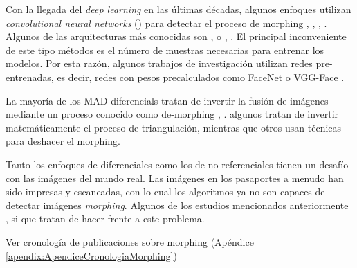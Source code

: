 Con la llegada del \textit{deep learning} en las últimas décadas, algunos enfoques utilizan \textit{convolutional neural networks} () para detectar el proceso de \gls{morphing} \cite{seibold2017detection}, \cite{seibold2018accurate}, \cite{wandzik2018morphing}, \cite{damer2018morgan}. Algunos de las arquitecturas más conocidas son  \cite{simonyan2014very},  \cite{krizhevsky2012imagenet} o  \cite{goodfellow2014generative}, \cite{debiasi2019detection}. El principal inconveniente de este tipo métodos es el número de muestras necesarias para entrenar los modelos. Por esta razón, algunos trabajos de investigación utilizan redes pre-entrenadas, es decir, redes con pesos precalculados como \gls{FaceNet} \cite{schroff2015facenet} o \gls{VGG-Face} \cite{parkhi2015deep}.

La mayoría de los \Glspl{MAD diferencial} tratan de invertir la fusión de imágenes mediante un proceso conocido como \gls{de-morphing}  \cite{ferrara2017face}, \cite{ferrara2018face}. algunos tratan de invertir matemáticamente el proceso de triangulación, mientras que otros usan técnicas  para deshacer el \gls{morphing}.

Tanto los enfoques de diferenciales como los de no-referenciales  tienen un desafío con las imágenes del mundo real. Las imágenes en los pasaportes a menudo han sido impresas y escaneadas, con lo cual los algoritmos  ya no son capaces de detectar imágenes \textit{\gls{morphing}}. Algunos de los estudios mencionados anteriormente \cite{ferrara2017face}, \cite{ferrara2018face} si que tratan de hacer frente a este problema. 

\color{red}
Ver cronología de publicaciones sobre \Gls{morphing} (Apéndice  \ref{apendix:ApendiceCronologiaMorphing})
\color{black}




